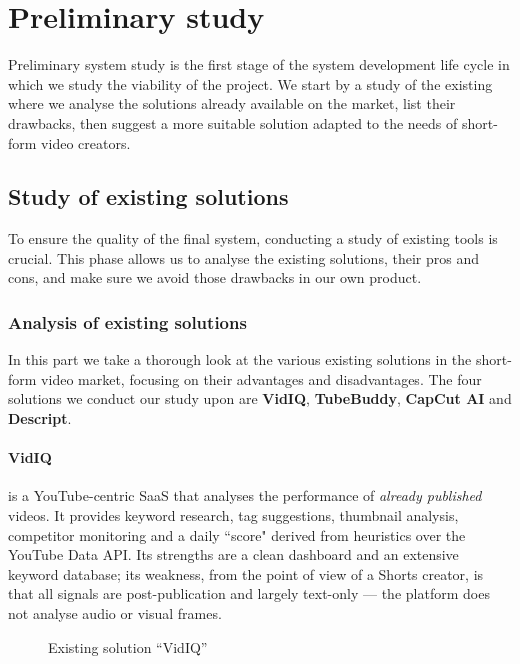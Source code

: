 \section{Preliminary study}
\label{sec:prelim}

Preliminary system study is the first stage of the system development life cycle in which we
study the viability of the project. We start by a study of the existing where we analyse the
solutions already available on the market, list their drawbacks, then suggest a more suitable
solution adapted to the needs of short-form video creators.

\subsection{Study of existing solutions}
\label{sec:existing}

To ensure the quality of the final system, conducting a study of existing tools is crucial.
This phase allows us to analyse the existing solutions, their pros and cons, and make sure we
avoid those drawbacks in our own product.

\subsubsection{Analysis of existing solutions}
\label{sec:existing_analysis}

In this part we take a thorough look at the various existing solutions in the short-form
video market, focusing on their advantages and disadvantages. The four solutions we conduct
our study upon are \textbf{VidIQ}, \textbf{TubeBuddy}, \textbf{CapCut AI} and \textbf{Descript}.

\paragraph{VidIQ} is a YouTube-centric SaaS that analyses the performance of \emph{already
published} videos. It provides keyword research, tag suggestions, thumbnail analysis,
competitor monitoring and a daily ``score" derived from heuristics over the YouTube Data API.
Its strengths are a clean dashboard and an extensive keyword database; its weakness, from the
point of view of a Shorts creator, is that all signals are post-publication and largely
text-only --- the platform does not analyse audio or visual frames.

\begin{figure}[H]
  \centering
  \caption{Existing solution \textquotedblleft VidIQ\textquotedblright}
  \label{fig:vidiq}
\end{figure}

